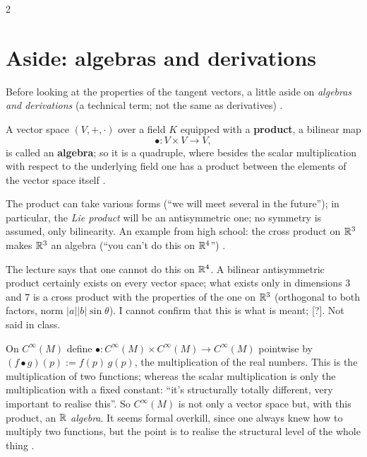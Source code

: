 \begin{paracol}{2}
\section{Aside: algebras and derivations}\label{sec:tv-derivation}

Before looking at the properties of the tangent vectors, a little aside on \emph{algebras and derivations} (a technical term; not the same as derivatives)  .

\begin{definition}\label{def:tv-algebra}
A vector space $(V,+,\cdot)$ over a field $K$ equipped with a \textbf{product}, a bilinear map
\[
  \bullet\colon V\times V\to V,
\]
is called an \textbf{algebra}; so it is a quadruple, where besides the scalar multiplication with respect to the underlying field one has a product between the elements of the vector space itself    .
\end{definition}
The product can take various forms (``we will meet several in the future''); in particular, the \emph{Lie product} will be an antisymmetric one; no symmetry is assumed, only bilinearity. An example from high school: the cross product on $\mathbb{R}^3$ makes $\mathbb{R}^3$ an algebra (``you can't do this on $\mathbb{R}^4$'')
 .
\begin{coursenote}
The lecture says that one cannot do this on $\mathbb{R}^4$. A bilinear antisymmetric product certainly exists on every vector space; what exists only in dimensions $3$ and $7$ is a cross product with the properties of the one on $\mathbb{R}^3$ (orthogonal to both factors, norm $|a||b|\sin\theta$). I cannot confirm that
this is what is meant; [?]. Not said in class.
\end{coursenote}
\begin{example}\label{ex:tv-cinf-alg}
On $C^\infty(M)$ define $\bullet\colon C^\infty(M)\times C^\infty(M)\to C^\infty(M)$ pointwise by $(f\bullet g)(p):=f(p)\,g(p)$, the multiplication of the real numbers. This is the multiplication of two functions; whereas the scalar multiplication is only the multiplication with a fixed constant: ``it's structurally totally
different, very important to realise this''. So $C^\infty(M)$ is not only a vector space but, with this product, an $\mathbb{R}$ \emph{algebra}. It seems formal overkill, since one always knew how to multiply two functions, but the point is to realise the structural level of the whole thing
    .
\end{example}


\end{paracol}
